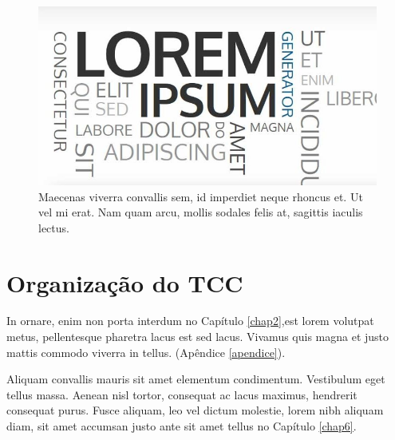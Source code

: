 \begin{figure}[H]
    \centering
    \includegraphics[width=0.5\linewidth]{Imagens/chap01/loren-ipsum-cover.jpg}
    \caption{Maecenas viverra convallis sem, id imperdiet neque rhoncus et. Ut vel mi erat. Nam quam arcu, mollis sodales felis at, sagittis iaculis lectus.}
    \label{fig:lorem_ipsum}
\end{figure}

\section{Organização do TCC}

In ornare, enim non porta interdum no Capítulo \ref{chap2},est lorem volutpat metus, pellentesque pharetra lacus est sed lacus. Vivamus quis magna et justo mattis commodo viverra in tellus. (Apêndice \ref{apendice}).

Aliquam convallis mauris sit amet elementum condimentum. Vestibulum eget tellus massa. Aenean nisl tortor, consequat ac lacus maximus, hendrerit consequat purus. Fusce aliquam, leo vel dictum molestie, lorem nibh aliquam diam, sit amet accumsan justo ante sit amet tellus no Capítulo \ref{chap6}.